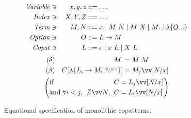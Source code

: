 \documentclass[sigplan,screen]{acmart}
\begin{document}
\begin{figure}
\centering
\begin{alignat*}{2}
  \mathit{Variable} &\ni{}& x, y, z
  &::= \dots
  \\
  \mathit{Index} &\ni{}& X, Y, Z
  &::= \dots
  \\
  \mathit{Term} &\ni{}& M, N
  &::= x
  \mid M ~ N
  \mid M ~ X
  \mid M .
  \mid \lambda \{O\overset{{}_{}}{...}\}
  \\
  \mathit{Option} &\ni{}& O
  &::= L \to M
  \\
  \mathit{Copat} &\ni{}& L
  &::= \varepsilon
  \mid x ~ L
  \mid X ~ L
\end{alignat*}
\begin{align*}
  \begin{aligned}
    (\delta)&&
    M. &= M ~ M
    \\
    (\beta)&&
    C[\lambda\{\many[1 \leq i \leq n]{L_i \to M_i}\}]
    &=
    M_j\vect{\subst{x}{N}}
  \end{aligned}
  \\
  \left(
    \begin{alignedat}{2}
      &\text{if } &C &= L_j\vect{\subst{x}{N}}
      \\
      &\text{and } &\forall i < j,~
      \not\exists \vect{N},~ C &= L_i\vect{\subst{x}{N}}
    \end{alignedat}
  \right)
\end{align*}
\caption{Equational specification of monolithic copatterns.}
\label{fig:block-copat-spec}
\end{figure}
\end{document}
